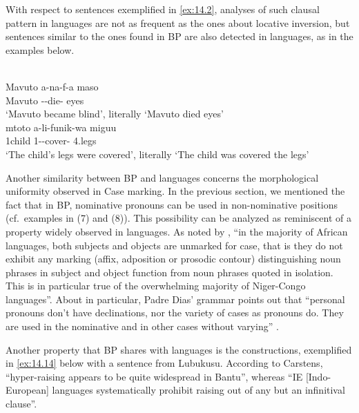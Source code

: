 \documentclass[output=paper]{langsci/langscibook}
\begin{document}
With respect to  sentences exemplified in \eqref{ex:14.2},
analyses of such clausal pattern in  languages are not as frequent as the
ones about locative inversion, but  sentences similar to the
ones found in \gls{BP} are also detected in  languages, as in the
examples below.

\ea\label{ex:14.12}  \parencite[23]{Simango2007}\\
    \gll    Mavuto a-na-f-a maso\\
            Mavuto \Sm-\Pst{}-die-\Fv{} eyes\\
    \glt    ‘Mavuto became blind’, literally \enquote*{Mavuto died eyes}
\ex\label{ex:14.13}  \parencite[83]{KeachRochemont1992}\\
    \gll    mtoto   a-li-funik-wa miguu\\
            1child 1-\Pst{}-cover-\Pass{} 4.legs\\
    \glt    ‘The child’s legs were covered’, literally ‘The child was covered the legs’
\z

Another similarity between \gls{BP} and  languages concerns the
morphological uniformity observed in Case marking. In the previous section, we
mentioned the fact that in BP, nominative pronouns can be used in
non-nominative positions (cf.\ examples in (7) and (8)). This possibility can
be analyzed as reminiscent of a property widely observed in 
languages. As noted by \citet[233]{Creissels2000}, “in the majority of African
languages, both subjects and objects are unmarked for case, that is they do not
exhibit any marking (affix, adposition or prosodic contour) distinguishing noun
phrases in subject and object function from noun phrases quoted in isolation.
This is in particular true of the overwhelming majority of Niger-Congo
languages”.  About  in particular, Padre Dias' grammar points out
that “personal pronouns don’t have declinations, nor the variety of cases as
 pronouns do. They are used in the nominative
and in other cases without varying” \parencite[8]{Dias2006}.

Another property that \gls{BP} shares with  languages is the
 constructions, exemplified in \eqref{ex:14.14} below with a
sentence from Lubukusu. According to Carstens, “hyper-raising appears to be
quite widespread in Bantu”, whereas “IE [Indo-European] languages
systematically prohibit raising out of any but an infinitival clause”.
\end{document}
